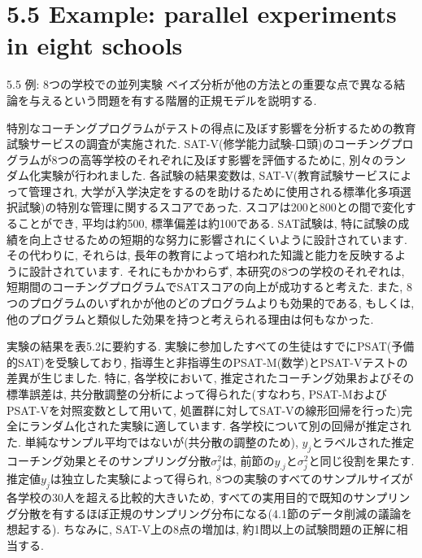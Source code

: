 \documentclass[10pt,dvipdfmx,a4]{beamer}
\begin{document}
\section{5.5 Example: parallel experiments in eight schools}
\begin{frame}{5.5 例: 8つの学校での並列実験}
ベイズ分析が他の方法との重要な点で異なる結論を与えるという問題を有する階層的正規モデルを説明する.

特別なコーチングプログラムがテストの得点に及ぼす影響を分析するための教育試験サービスの調査が実施された.
SAT-V(修学能力試験-口頭)のコーチングプログラムが8つの高等学校のそれぞれに及ぼす影響を評価するために, 別々のランダム化実験が行われました.
各試験の結果変数は, SAT-V(教育試験サービスによって管理され, 大学が入学決定をするのを助けるために使用される標準化多項選択試験)の特別な管理に関するスコアであった.
スコアは200と800との間で変化することができ, 平均は約500, 標準偏差は約100である.
SAT試験は, 特に試験の成績を向上させるための短期的な努力に影響されにくいように設計されています.
その代わりに, それらは, 長年の教育によって培われた知識と能力を反映するように設計されています.
それにもかかわらず, 本研究の8つの学校のそれぞれは, 短期間のコーチングプログラムでSATスコアの向上が成功すると考えた.
また, 8つのプログラムのいずれかが他のどのプログラムよりも効果的である, もしくは, 他のプログラムと類似した効果を持つと考えられる理由は何もなかった.
\end{frame}


\begin{frame}
実験の結果を表5.2に要約する.
実験に参加したすべての生徒はすでにPSAT(予備的SAT)を受験しており, 指導生と非指導生のPSAT-M(数学)とPSAT-Vテストの差異が生じました.
特に, 各学校において, 推定されたコーチング効果およびその標準誤差は, 共分散調整の分析によって得られた(すなわち, PSAT-MおよびPSAT-Vを対照変数として用いて, 処置群に対してSAT-Vの線形回帰を行った)完全にランダム化された実験に適しています.
各学校について別の回帰が推定された.
単純なサンプル平均ではないが(共分散の調整のため), $y_j$とラベルされた推定コーチング効果とそのサンプリング分散$\sigma^2_j$は, 前節の$y_{.j}$と$\sigma^2_j$と同じ役割を果たす.
推定値$y_j$は独立した実験によって得られ, 8つの実験のすべてのサンプルサイズが各学校の30人を超える比較的大きいため, すべての実用目的で既知のサンプリング分散を有するほぼ正規のサンプリング分布になる(4.1節のデータ削減の議論を想起する).
ちなみに, SAT-V上の8点の増加は, 約1問以上の試験問題の正解に相当する.
\end{frame}
\end{document}
